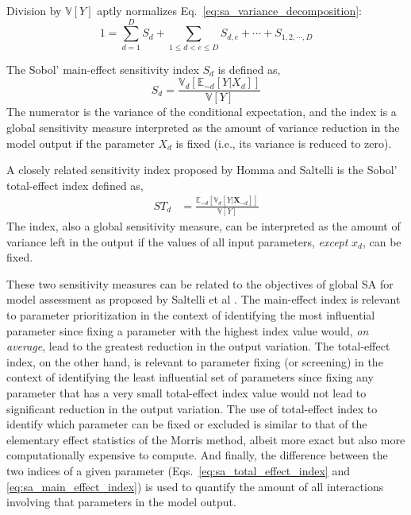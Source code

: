Division by $\mathbb{V}[Y]$ aptly normalizes Eq.~\ref{eq:sa_variance_decomposition}:
\begin{equation}
  1 = \sum_{d = 1}^{D} S_d + \sum_{1 \leq d < e \leq D} S_{d,e} + \cdots + S_{1,2,\cdots,D}
\label{eq:sa_normalized_variance}
\end{equation}

The Sobol' main-effect sensitivity index $S_d$ is defined as,
\begin{equation}
  S_d = \frac{\mathbb{V}_d [\mathbb{E}_{\sim d} [Y|X_d]]}{\mathbb{V}[Y]}
\label{eq:sa_main_effect_index}
\end{equation}
The numerator is the variance of the conditional expectation,
and the index is a global sensitivity measure interpreted as the amount of variance reduction in the model output if the parameter $X_d$ is fixed (i.e., its variance is reduced to zero).

A closely related sensitivity index proposed by Homma and Saltelli \cite{Homma1996} is the Sobol' total-effect index defined as,
\begin{equation}
  \begin{split}
    ST_{d} & = \frac{\mathbb{E}_{\sim d}[\mathbb{V}_{d}[Y|\mathbf{X}_{\sim d}]]}{\mathbb{V}[Y]}
  \end{split}
\label{eq:sa_total_effect_index}
\end{equation}
The index, also a global sensitivity measure, can be interpreted as the amount of variance left in the output if the values of all input parameters, 
\emph{except} $x_d$, can be fixed.

These two sensitivity measures can be related to the objectives of global SA for model assessment as proposed by Saltelli et al \cite{Saltelli2004,Saltelli2008}.
The main-effect index is relevant to parameter prioritization in the context of identifying the most influential parameter since fixing a parameter with the highest index value would, \emph{on average}, lead to the greatest reduction in the output variation.
The total-effect index, on the other hand, is relevant to parameter fixing (or screening) in the context of identifying the least influential set of parameters since fixing any parameter that has a very small total-effect index value would not lead to significant reduction in the output variation.
The use of total-effect index to identify which parameter can be fixed or excluded is similar to that of the elementary effect statistics of the Morris method, 
albeit more exact but also more computationally expensive to compute.
And finally, the difference between the two indices of a given parameter (Eqs.~\ref{eq:sa_total_effect_index} and \ref{eq:sa_main_effect_index}) is used to quantify the amount of all interactions involving that parameters in the model output.
